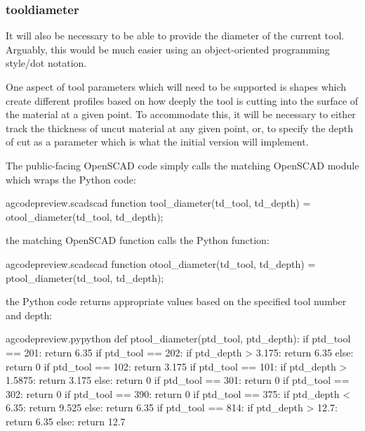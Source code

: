 \documentclass{ltxdoc}
\begin{document}
\subsubsection{tooldiameter}

It will also be necessary to be able to provide the diameter of the current tool.
Arguably, this would be much easier using an object-oriented programming style/dot notation.

One aspect of tool parameters which will need to be supported is shapes which create
different profiles based on how deeply the tool is cutting into the surface of the 
material at a given point. To accommodate this, it will be necessary to either track
the thickness of uncut material at any given point, or, to specify the depth of cut 
as a parameter which is what the initial version will implement.

The public-facing OpenSCAD code simply calls the matching OpenSCAD module which wraps the Python code:
 
\lstset{firstnumber=\thegcpscad}
\begin{writecode}{a}{gcodepreview.scad}{scad}
function tool_diameter(td_tool, td_depth) = otool_diameter(td_tool, td_depth);

\end{writecode}
\addtocounter{gcpscad}{2}

\noindent the matching OpenSCAD function calls the Python function:

\lstset{firstnumber=\thegcpscad}
\begin{writecode}{a}{gcodepreview.scad}{scad}
function otool_diameter(td_tool, td_depth) = ptool_diameter(td_tool, td_depth);

\end{writecode}
\addtocounter{gcpscad}{2}
 
\noindent the Python code returns appropriate values 
based on the specified tool number and depth:
 
\lstset{firstnumber=\thegcpy}
\begin{writecode}{a}{gcodepreview.py}{python}
def ptool_diameter(ptd_tool, ptd_depth):
    if ptd_tool == 201:
        return 6.35
    if ptd_tool == 202:
        if ptd_depth > 3.175:
            return 6.35
        else:
            return 0
    if ptd_tool == 102:
        return 3.175
    if ptd_tool == 101:
        if ptd_depth > 1.5875:
            return 3.175
        else:
            return 0
    if ptd_tool == 301:
        return 0
    if ptd_tool == 302:
        return 0
    if ptd_tool == 390:
        return 0
    if ptd_tool == 375:
        if ptd_depth < 6.35:
            return 9.525
        else:
            return 6.35
    if ptd_tool == 814:
        if ptd_depth > 12.7:
            return 6.35
        else:
            return 12.7

\end{writecode}
\addtocounter{gcpy}{32}
\end{document}
